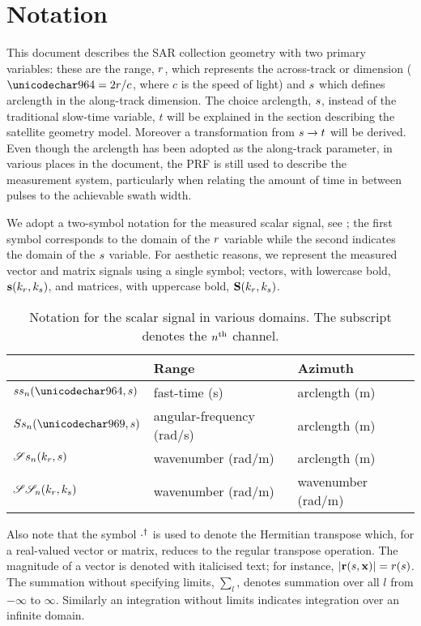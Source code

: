 \section{Notation}
\label{sc:notation}
This document describes the SAR collection geometry with two primary variables: these are the range, $r$, which represents the across-track or  dimension ($\fasttime = 2\range/c$, where $c$ is the speed of light) and $s$ which defines arclength in the along-track dimension. The choice arclength, $s$, instead of the traditional slow-time variable, $t$ will be explained in the section describing the satellite geometry model. Moreover a transformation from $s\rightarrow t$ will be derived. Even though the arclength has been adopted as the along-track parameter, in various places in the document, the PRF is still used to describe the measurement system, particularly when relating the amount of time in between pulses to the achievable swath width.
\par
We adopt a two-symbol notation for the measured scalar signal, see ; the first symbol corresponds to the domain of the $r$ variable while the second indicates the domain of the $s$ variable. For aesthetic reasons, we represent the measured vector and matrix signals using a single symbol; vectors, with lowercase bold, $\mathbf{s}(k_r,k_{s})$, and matrices, with uppercase bold, $\SkSkM(\kr,\kparm)$.
\begin{table}[b!]
\begin{center}
\begin{tabular}{l|l|l}
 & {\bf Range} & {\bf Azimuth}\\\hline
 $\stst{\channelIndex}(\fasttime, \parm)$ & fast-time (s) & arclength (m)\\\hline
 $\Sfst{\channelIndex}(\omega, \parm)$ & angular-frequency (rad/s) & arclength (m)\\\hline
 $\mathscr{S}s_{n}(k_r, s)$ & wavenumber (rad/m) & arclength (m)\\\hline
 $\mathscr{S}\mathscr{S}_{n}(k_r, k_{s})$ & wavenumber (rad/m) & wavenumber (rad/m)\\\hline
\end{tabular}
\caption{Notation for the scalar signal in various domains. The subscript denotes the $n^\text{th}$ channel.}
\label{tb:notation}
\end{center}
\end{table}
Also note that the symbol $\cdot^\dagger$ is used to denote the Hermitian transpose which, for a real-valued vector or matrix, reduces to the regular transpose operation. The magnitude of a vector is denoted with italicised text; for instance, $\lvert\mathbf{r}(s, \mathbf{\mathbf{x}})\rvert = \mathnormal{r}(s)$. The summation without specifying limits, $\sum_l$, denotes summation over all $l$ from $-\infty$ to $\infty$. Similarly an integration without limits indicates integration over an infinite domain.

